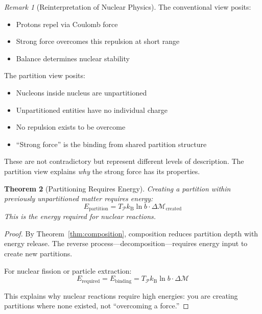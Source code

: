 \documentclass[twocolumn,10pt,a4paper]{article}
\newtheorem{theorem}{Theorem}[section]
\theoremstyle{definition}
\theoremstyle{remark}
\newtheorem{remark}[theorem]{Remark}
\newcommand{\kB}{k_{\mathrm{B}}}
\newcommand{\Partition}{\mathcal{P}}
\newcommand{\Depth}{\mathcal{M}}
\begin{document}
\begin{remark}[Reinterpretation of Nuclear Physics]
The conventional view posits:
\begin{itemize}
    \item Protons repel via Coulomb force
    \item Strong force overcomes this repulsion at short range
    \item Balance determines nuclear stability
\end{itemize}

The partition view posits:
\begin{itemize}
    \item Nucleons inside nucleus are unpartitioned
    \item Unpartitioned entities have no individual charge
    \item No repulsion exists to be overcome
    \item ``Strong force'' is the binding from shared partition structure
\end{itemize}

These are not contradictory but represent different levels of description. The partition view explains \emph{why} the strong force has its properties.
\end{remark}

\begin{theorem}[Partitioning Requires Energy]
\label{thm:partition_energy}
Creating a partition within previously unpartitioned matter requires energy:
\begin{equation}
    E_{\text{partition}} = T_{\Partition} \kB \ln b \cdot \Delta\Depth_{\text{created}}
\end{equation}
This is the energy required for nuclear reactions.
\end{theorem}

\begin{proof}
By Theorem~\ref{thm:composition}, composition reduces partition depth with energy release. The reverse process---decomposition---requires energy input to create new partitions.

For nuclear fission or particle extraction:
\begin{equation}
    E_{\text{required}} = E_{\text{binding}} = T_{\Partition} \kB \ln b \cdot \Delta\Depth
\end{equation}

This explains why nuclear reactions require high energies: you are creating partitions where none existed, not ``overcoming a force.''
\end{proof}
\end{document}
